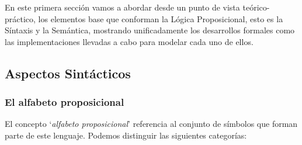 \documentclass[a4paper]{report}
\begin{document}
En este primera sección vamos a abordar desde un punto de vista teórico-práctico, los elementos base que conforman la Lógica Proposicional, esto es la Síntaxis y la Semántica, mostrando unificadamente los desarrollos formales como las implementaciones llevadas a cabo para modelar cada uno de ellos.

\subsection{Aspectos Sintácticos}

\subsubsection{El alfabeto proposicional}

El concepto `\textit{alfabeto proposicional}' referencia al conjunto de símbolos que forman parte de este lenguaje. Podemos distinguir las siguientes categorías:
\end{document}
